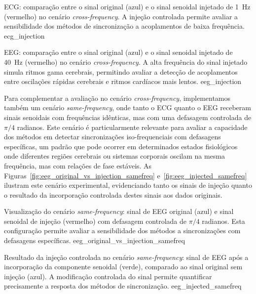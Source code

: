 {ECG: comparação entre o sinal original (azul) e o sinal senoidal injetado de 1~Hz (vermelho) no cenário \textit{cross-frequency}. A injeção controlada permite avaliar a sensibilidade dos métodos de sincronização a acoplamentos de baixa frequência.}
{ecg_injection}

{EEG: comparação entre o sinal original (azul) e o sinal senoidal injetado de 40~Hz (vermelho) no cenário \textit{cross-frequency}. A alta frequência do sinal injetado simula ritmos gama cerebrais, permitindo avaliar a detecção de acoplamentos entre oscilações rápidas cerebrais e ritmos cardíacos mais lentos.}
{eeg_injection}

Para complementar a avaliação no cenário \textit{cross-frequency}, implementamos também um cenário \textit{same-frequency}, onde tanto o ECG quanto o EEG receberam sinais senoidais com frequências idênticas, mas com uma defasagem controlada de \(\pi/4\) radianos. Este cenário é particularmente relevante para avaliar a capacidade dos métodos em detectar sincronizações iso-frequenciais com defasagens específicas, um padrão que pode ocorrer em determinados estados fisiológicos onde diferentes regiões cerebrais ou sistemas corporais oscilam na mesma frequência, mas com relações de fase estáveis. As Figuras~\ref{fig:eeg_original_vs_injection_samefreq} e~\ref{fig:eeg_injected_samefreq} ilustram este cenário experimental, evidenciando tanto os sinais de injeção quanto o resultado da incorporação controlada destes sinais aos dados originais.

{Visualização do cenário \textit{same-frequency}: sinal de EEG original (azul) e sinal senoidal de injeção (vermelho) com defasagem controlada de \(\pi/4\) radianos. Esta configuração permite avaliar a sensibilidade dos métodos a sincronizações com defasagens específicas.}
{eeg_original_vs_injection_samefreq}

{Resultado da injeção controlada no cenário \textit{same-frequency}: sinal de EEG após a incorporação da componente senoidal (verde), comparado ao sinal original sem injeção (azul). A modificação controlada do sinal permite quantificar precisamente a resposta dos métodos de sincronização.}
{eeg_injected_samefreq}

